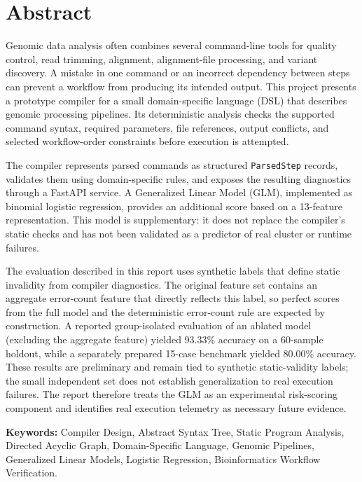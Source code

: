 \documentclass[12pt,a4paper]{article}
\begin{document}
\section*{Abstract}

Genomic data analysis often combines several command-line tools for quality control, read trimming, alignment, alignment-file processing, and variant discovery. A mistake in one command or an incorrect dependency between steps can prevent a workflow from producing its intended output. This project presents a prototype compiler for a small domain-specific language (DSL) that describes genomic processing pipelines. Its deterministic analysis checks the supported command syntax, required parameters, file references, output conflicts, and selected workflow-order constraints before execution is attempted.

The compiler represents parsed commands as structured \texttt{ParsedStep} records, validates them using domain-specific rules, and exposes the resulting diagnostics through a FastAPI service. A Generalized Linear Model (GLM), implemented as binomial logistic regression, provides an additional score based on a 13-feature representation. This model is supplementary: it does not replace the compiler's static checks and has not been validated as a predictor of real cluster or runtime failures.

The evaluation described in this report uses synthetic labels that define static invalidity from compiler diagnostics. The original feature set contains an aggregate error-count feature that directly reflects this label, so perfect scores from the full model and the deterministic error-count rule are expected by construction. A reported group-isolated evaluation of an ablated model (excluding the aggregate feature) yielded 93.33\% accuracy on a 60-sample holdout, while a separately prepared 15-case benchmark yielded 80.00\% accuracy. These results are preliminary and remain tied to synthetic static-validity labels; the small independent set does not establish generalization to real execution failures. The report therefore treats the GLM as an experimental risk-scoring component and identifies real execution telemetry as necessary future evidence.

\vspace{0.4cm}
\textbf{Keywords:} Compiler Design, Abstract Syntax Tree, Static Program Analysis, Directed Acyclic Graph, Domain-Specific Language, Genomic Pipelines, Generalized Linear Models, Logistic Regression, Bioinformatics Workflow Verification.
\end{document}
